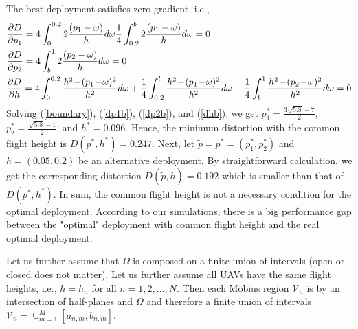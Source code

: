 \documentclass[smallabstract,smallcaptions]{dccpaper}
\newcommand{\Vor}{\ensuremath{\mathcal{V}}}         %
\begin{document}
The best deployment satisfies zero-gradient, i.e.,
\begin{align}
    &\frac{\partial D}{\partial p_1} = 4\int_{0}^{0.2}2\frac{(p_1-\ome)}{h}d\ome
    \frac{1}{4}\int_{0.2}^{b}2\frac{(p_1-\ome)}{h}d\ome=0 \label{dp1b}\\
    &\frac{\partial D}{\partial p_2} = 4\int_{b}^{1}2\frac{(p_2-\ome)}{h}d\ome=0\label{dp2b}\\
    &\frac{\partial D}{\partial h} = 4\int_{0}^{0.2}\frac{h^2\!-\!(p_1\!-\!\ome)^2}{h^2}d\ome 
    + \frac{1}{4}\int_{0.2}^{b}\frac{h^2\!-\!(p_1\!-\!\ome)^2}{h^2}d\ome 
    + \frac{1}{4}\int_{b}^1\frac{h^2\!-\!(p_2\!-\!\ome)^2}{h^2}d\ome= 0\label{dhb}
\end{align}
Solving (\ref{boundary}), (\ref{dp1b}), (\ref{dp2b}), and (\ref{dhb}), we get $p^*_1=\frac{3\sqrt{5.8}-7}{2}$,
$p^*_2=\frac{\sqrt{5.8}-1}{2}$, and $h^*=0.096$.
Hence, the minimum distortion with the common flight height is $D(p^*, h^*)=0.247$.
Next, let $\widetilde{p}=p^*=(p^{*}_1,p^*_2)$ and $\widetilde{h}=(0.05,0.2)$ be an alternative deployment.
By straightforward calculation, we get the corresponding distortion $D(\widetilde{p},\widetilde{h})=0.192$ which is smaller than that of $D(p^*, h^*)$.
In sum, the common flight height is not a necessary condition for the optimal deployment.
According to our simulations, there is a big performance gap between the "optimal" deployment with common flight height
and the real optimal deployment.  


Let us further assume that
$\Omega$ is composed on a finite union of intervals  (open or closed does not matter).  Let us further assume all UAVs
have the same flight heights, i.e., $h=h_n$  for all $n=1,2,\dots,N$.  Then each  Möbius region $\Vor_n$ is by
 an intersection of half-planes and $\Omega$ and therefore a finite union of intervals
$\Vor_n=\cup_{m=1}^M [a_{n,m},b_{n,m}]$.  
\end{document}
